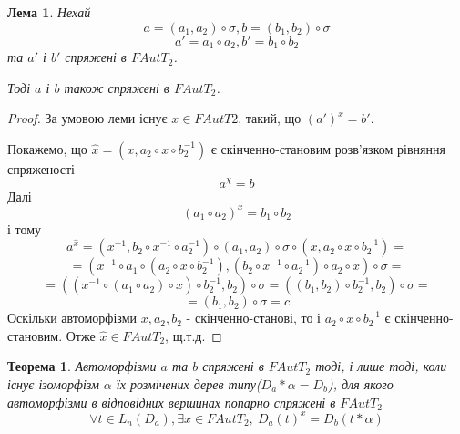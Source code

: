 \documentclass[a4paper,12pt]{article} \usepackage{a4wide}
\numberwithin{equation}{subsection}
\newtheorem{theorem}{Теорема}[subsection]
\newtheorem{lemma}{Лема}[subsection]
\begin{document}
\begin{lemma}\label{unique_solution_upper_vertex}
  Нехай $$a = (a_1,a_2)\circ\sigma, b = (b_1,b_2)\circ\sigma$$ $$a' =
  a_1\circ a_2 ,b' = b_1\circ b_2 $$ та $a'$ і $b'$ спряжені в
  $FAutT_2$.

  Тоді $a$ і $b$ також спряжені в $FAutT_2$.
\end{lemma}
\begin{proof}
  За умовою леми існує $x\in FAutT2$, такий, що $(a')^x = b' $.


  Покажемо, що $\hat{x} = (x, a_2\circ x \circ b_2^{-1})$ є
  скінченно-становим розв'язком рівняння спряженості
$$a^\chi = b$$
Далі
$$(a_1\circ a_2)^x = b_1\circ b_2$$
і тому %
$$a^{\hat{x}} = (x^{-1}, b_2\circ x^{-1} \circ a_2^{-1}) \circ (a_1,a_2)\circ \sigma \circ (x, a_2\circ x \circ b_2^{-1}) =$$
$$= (x^{-1}\circ a_1 \circ (a_2\circ x \circ b_2^{-1}),(b_2\circ x^{-1} \circ a_2^{-1})\circ a_2 \circ x )\circ \sigma= $$
$$= ((x^{-1}\circ (a_1 \circ a_2)\circ x) \circ b_2^{-1},b_2)\circ \sigma= ((b_1,b_2) \circ b_2^{-1},b_2)\circ \sigma =$$ $$ =(b_1,b_2)\circ \sigma = c $$
Оскільки автоморфізми $x, a_2, b_2$ - скінченно-станові, то і
$a_2\circ x \circ b_2^{-1}$ є скінченно-становим. Отже $\hat{x}\in
FAutT_2$, щ.т.д.

\end{proof}
\begin{theorem}\label{marked_trees_conj}
  Автоморфізми $a$ та $b$ спряжені в $FAutT_2$ тоді, і лише тоді, коли
  існує ізоморфізм $\alpha$ їх розмічених дерев типу($D_a*\alpha =
  D_b$), для якого автоморфізми в відповідних вершинах попарно
  спряжені в $FAutT_2$
$$\forall t\in L_n(D_a), \exists x\in FAutT_2,\ D_a(t)^x= D_b(t*\alpha) $$
\end{theorem}
\end{document}
